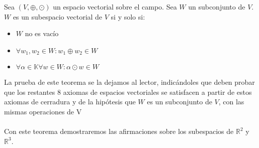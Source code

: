 \begin{theorem}
Sea $\left(V, \oplus, \odot\right)$ un espacio vectorial sobre el campo. Sea $W$ un subconjunto de $V$. $W$ es un subespacio vectorial de $V$ si y solo si:
	
	\begin{itemize}
	\item $W$ no es vac\'io
	\item $\forall w_1, w_2 \in W: w_1\oplus w_2 \in W$
	\item $\forall \alpha \in \mathbb{K} \forall w \in W: \alpha \odot w \in W$
	
	\end{itemize}

\end{theorem}

La prueba de este teorema se la dejamos al lector, indic\'andoles que deben probar que los restantes 8 axiomas de espacios vectoriales se satisfacen a partir de estos axiomas de cerradura y de la hip\'otesis que $W$ es un subconjunto de $V$, con las mismas operaciones de V
\\
\\
Con este teorema demostraremos las afirmaciones sobre los subespacios de $\mathbb{R}^2$ y 
$\mathbb{R}^3$.

